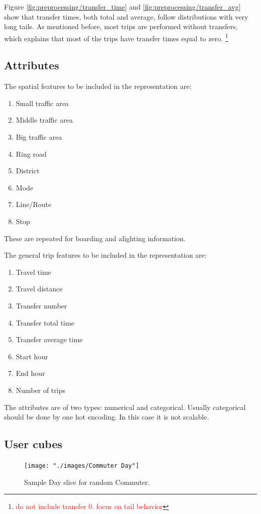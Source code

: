 \documentclass{article}
\newcommand{\selfnote}[1]{\footnote{\textcolor{red}{#1}}}
\begin{document}
Figure \ref{fig:preprocessing/transfer_time} and \ref{fig:preprocessing/transfer_avg} show that transfer times, both total and average, follow distributions with very long tails. As mentioned before, most trips are performed without transfers, which explains that most of the trips have transfer times equal to zero. \selfnote{do not include transfer 0. focus on tail behavior}


\subsection{Attributes}
The spatial features to be included in the representation are:

\begin{enumerate}
\item Small traffic area
\item Middle traffic area
\item Big traffic area
\item Ring road
\item District
\item Mode
\item Line/Route
\item Stop
\end{enumerate}

These are repeated for boarding and alighting information.

The general trip features to be included in the representation are: 

\begin{enumerate}
\item Travel time
\item Travel distance
\item Transfer number
\item Transfer total time
\item Transfer average time
\item Start hour
\item End hour
\item Number of trips
\end{enumerate}

The attributes are of two types: numerical and categorical. Usually categorical should be done by one hot encoding. In this case it is not scalable.

\subsection{User cubes}

\begin{figure}[H]
  \centering
  \texttt{[image: "./images/Commuter Day"]}
  \caption{Sample Day slice for random Commuter.}
  \label{fig:preprocessing/commuter}
\end{figure}
\end{document}
